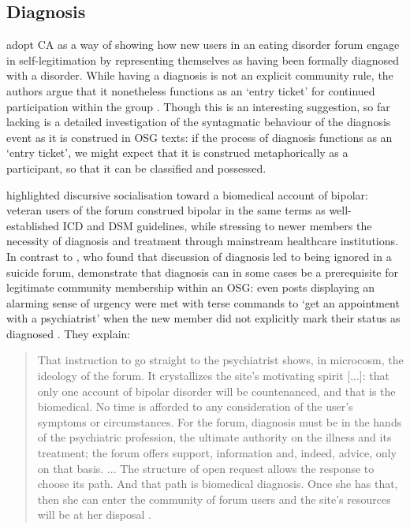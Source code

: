 \documentclass{article}
\begin{document}
\subsection{Diagnosis}

\textcite{stommel_use_2011} adopt CA as a way of showing how new users in an eating disorder forum engage in self-legitimation by representing themselves as having been formally diagnosed with a disorder. While having a diagnosis is not an explicit community rule, the authors argue that it nonetheless functions as an `entry ticket' for continued participation within the group \parencite*[p.~6]{stommel_use_2011}. Though this is an interesting suggestion, so far lacking is a detailed investigation of the syntagmatic behaviour of the diagnosis event as it is construed in OSG texts: if the process of diagnosis functions as an `entry ticket', we might expect that it is construed metaphorically as a participant, so that it can be classified and possessed.

\textcite[c.f. Section \ref{sect:advice}]{vayreda_social_2009} highlighted discursive socialisation toward a biomedical account of bipolar: veteran users of the forum construed bipolar in the same terms as well-established ICD and DSM guidelines, while stressing to newer members the necessity of diagnosis and treatment through mainstream healthcare institutions. In contrast to \textcite{horne_doing_2009}, who found that discussion of diagnosis led to being ignored in a suicide forum, \citeauthor{vayreda_social_2009} demonstrate that diagnosis can in some cases be a prerequisite for legitimate community membership within an OSG: even posts displaying an alarming sense of urgency were met with terse commands to `get an appointment with a psychiatrist' when the new member did not explicitly mark their status as diagnosed \parencite*[p.~940]{vayreda_social_2009}. They explain:

\begin{quote}\small\singlespacing
That instruction to go straight to the psychiatrist shows, in microcosm, the ideology of the forum. It crystallizes the site's motivating spirit [...]: that only one account of bipolar disorder will be countenanced, and that is the biomedical. No time is afforded to any consideration of the user's symptoms or circumstances. For the forum, diagnosis must be in the hands of the psychiatric profession, the ultimate authority on the illness and its treatment; the forum offers support, information and, indeed, advice, only on that basis. ... The structure of open request allows the response to choose its path. And that path is biomedical diagnosis. Once she has that, then she can enter the community of forum users and the site's resources will be at her disposal \parencite*[pp.~940--941]{vayreda_social_2009}.
\end{quote}
%
\end{document}
